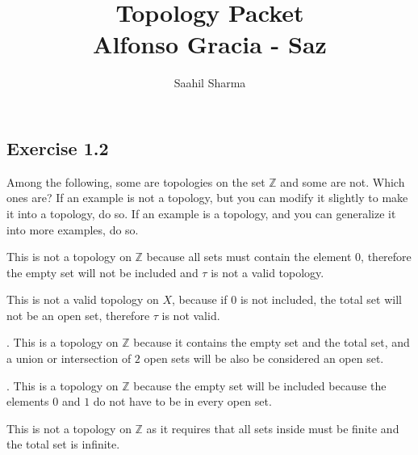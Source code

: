\documentclass{report}
\title{\Huge{Topology Packet}\\Alfonso Gracia - Saz}
\author{\huge{Saahil Sharma}}
\date{}
\begin{document}
\maketitle
\newpage
{}
\tableofcontents
\pagebreak

\chapter{}
\section{Exercise 1.2}
\begin{center} 
Among the following, some are topologies on the set $\mathbb{Z}$ and some are not. Which ones are? If an example is not a topology, but you can modify it slightly to make it into a topology, do so. If an example is a topology, and you can generalize it into more examples, do so.  
\end{center}
\sol This is not a topology on $\mathbb{Z}$ because all sets must contain the element $0$, therefore the empty set will not be included and $\tau$ is not a valid topology. 

\sol This is not a valid topology on $X$, because if $0$ is not included, the total set will not be an open set, therefore $\tau$ is not valid.  

.
\sol This is a topology on $\mathbb{Z}$ because it contains the empty set and the total set, and a union or intersection of $2$ open sets will be also be considered an open set. 

.
\sol This is a topology on $\mathbb{Z}$ because the empty set will be included because the elements $0$ and $1$ do not have to be in every open set.

\sol This is not a topology on $\mathbb{Z}$ as it requires that all sets inside must be finite and the total set is infinite.                                                         
\end{document}
